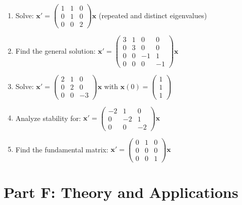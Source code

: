 \documentclass[12pt]{article}
\begin{document}
\begin{enumerate}[start=21]
\item Solve: $\mathbf{x}' = \begin{pmatrix} 1 & 1 & 0 \\ 0 & 1 & 0 \\ 0 & 0 & 2 \end{pmatrix}\mathbf{x}$ (repeated and distinct eigenvalues)

\item Find the general solution: $\mathbf{x}' = \begin{pmatrix} 3 & 1 & 0 & 0 \\ 0 & 3 & 0 & 0 \\ 0 & 0 & -1 & 1 \\ 0 & 0 & 0 & -1 \end{pmatrix}\mathbf{x}$

\item Solve: $\mathbf{x}' = \begin{pmatrix} 2 & 1 & 0 \\ 0 & 2 & 0 \\ 0 & 0 & -3 \end{pmatrix}\mathbf{x}$ with $\mathbf{x}(0) = \begin{pmatrix} 1 \\ 1 \\ 1 \end{pmatrix}$

\item Analyze stability for: $\mathbf{x}' = \begin{pmatrix} -2 & 1 & 0 \\ 0 & -2 & 1 \\ 0 & 0 & -2 \end{pmatrix}\mathbf{x}$

\item Find the fundamental matrix: $\mathbf{x}' = \begin{pmatrix} 0 & 1 & 0 \\ 0 & 0 & 0 \\ 0 & 0 & 1 \end{pmatrix}\mathbf{x}$
\end{enumerate}

\section*{Part F: Theory and Applications}
\end{document}
